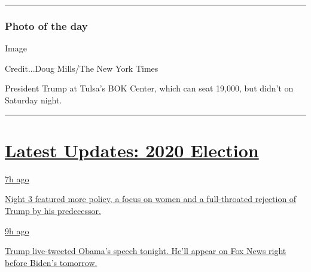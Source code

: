 \begin{center}\rule{0.5\linewidth}{\linethickness}\end{center}

\hypertarget{photo-of-the-day}{%
\subsubsection{Photo of the day}\label{photo-of-the-day}}

Image

Credit...Doug Mills/The New York Times

President Trump at Tulsa's BOK Center, which can seat 19,000, but didn't
on Saturday night.

\begin{center}\rule{0.5\linewidth}{\linethickness}\end{center}

\hypertarget{latest-updates-2020-election}{%
\section{\texorpdfstring{\href{https://www.nytimes3xbfgragh.onion/live/2020/08/19/us/dnc-convention-election?action=click\&pgtype=Article\&state=default\&region=MAIN_CONTENT_1\&context=storylines_live_updates}{Latest
Updates: 2020
Election}}{Latest Updates: 2020 Election}}\label{latest-updates-2020-election}}

\href{https://www.nytimes3xbfgragh.onion/live/2020/08/19/us/dnc-convention-election?action=click\&pgtype=Article\&state=default\&region=MAIN_CONTENT_1\&context=storylines_live_updates\#night-3-featured-more-policy-a-focus-on-women-and-a-full-throated-rejection-of-trump-by-his-predecessor}{7h
ago}

\href{https://www.nytimes3xbfgragh.onion/live/2020/08/19/us/dnc-convention-election?action=click\&pgtype=Article\&state=default\&region=MAIN_CONTENT_1\&context=storylines_live_updates\#night-3-featured-more-policy-a-focus-on-women-and-a-full-throated-rejection-of-trump-by-his-predecessor}{Night
3 featured more policy, a focus on women and a full-throated rejection
of Trump by his predecessor.}

\href{https://www.nytimes3xbfgragh.onion/live/2020/08/19/us/dnc-convention-election?action=click\&pgtype=Article\&state=default\&region=MAIN_CONTENT_1\&context=storylines_live_updates\#trump-live-tweeted-obamas-speech-tonight-hell-appear-on-fox-news-right-before-bidens-tomorrow}{9h
ago}

\href{https://www.nytimes3xbfgragh.onion/live/2020/08/19/us/dnc-convention-election?action=click\&pgtype=Article\&state=default\&region=MAIN_CONTENT_1\&context=storylines_live_updates\#trump-live-tweeted-obamas-speech-tonight-hell-appear-on-fox-news-right-before-bidens-tomorrow}{Trump
live-tweeted Obama's speech tonight. He'll appear on Fox News right
before Biden's tomorrow.}

